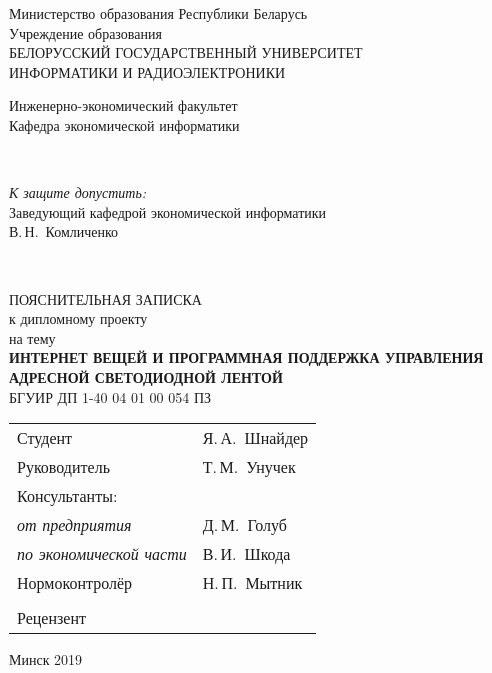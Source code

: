 \begin{titlepage}
  \begin{center}
    Министерство образования Республики Беларусь\\[1em]
    Учреждение образования\\
    БЕЛОРУССКИЙ ГОСУДАРСТВЕННЫЙ УНИВЕРСИТЕТ \\
    ИНФОРМАТИКИ И РАДИОЭЛЕКТРОНИКИ\\[1em]

    \begin{minipage}{\textwidth}
      \begin{flushleft}
          Инженерно-экономический факультет\\
          Кафедра экономической информатики\\
      \end{flushleft}
    \end{minipage}\\[3em]

    \begin{flushright}
      \begin{minipage}{0.45\textwidth}
        \textit{К защите допустить:}\\[0.8em]
        Заведующий кафедрой \newline экономической информатики\\[0.45em]
        \underline{\hspace*{2.8cm}} В.\,Н.~Комличенко
      \end{minipage}\\[2.2em]
    \end{flushright}

    {ПОЯСНИТЕЛЬНАЯ ЗАПИСКА}\\
    {к дипломному проекту}\\
    {на тему}\\[3em]
    \textbf{\large\MakeUppercase{Интернет вещей и программная поддержка управления адресной светодиодной лентой}}\\[1em]


    {БГУИР ДП  1-40 04 01 00 054 ПЗ}\\[2em]
    
    \begin{tabular}{ p{}p{} }
      Студент & Я.\,А.~Шнайдер \\
      Руководитель & Т.\,М.~Унучек \\
      Консультанты: &\\
      \hspace*{3ex}\emph{от предприятия} & Д.\,М.~Голуб \\
      \hspace*{3ex}\emph{по экономической части} & В.\,И.~Шкода \\
      Нормоконтролёр & Н.\,П.~Мытник\\
      & \\
      Рецензент &
    \end{tabular}
    
    \vfill
    {\normalsize Минск 2019}
  \end{center}
\end{titlepage}
